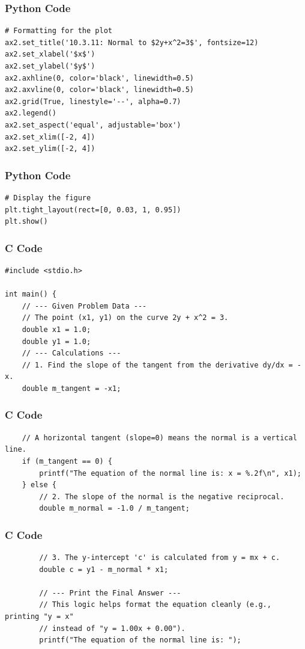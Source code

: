 \documentclass{beamer}
\begin{document}
\begin{frame}[fragile]
\frametitle{Python Code}
\begin{lstlisting}
# Formatting for the plot
ax2.set_title('10.3.11: Normal to $2y+x^2=3$', fontsize=12)
ax2.set_xlabel('$x$')
ax2.set_ylabel('$y$')
ax2.axhline(0, color='black', linewidth=0.5)
ax2.axvline(0, color='black', linewidth=0.5)
ax2.grid(True, linestyle='--', alpha=0.7)
ax2.legend()
ax2.set_aspect('equal', adjustable='box')
ax2.set_xlim([-2, 4])
ax2.set_ylim([-2, 4])
\end{lstlisting}
\end{frame}

\begin{frame}[fragile]
\frametitle{Python Code}
\begin{lstlisting}
# Display the figure
plt.tight_layout(rect=[0, 0.03, 1, 0.95])
plt.show()
\end{lstlisting}
\end{frame}

\begin{frame}[fragile]
\frametitle{C Code}
\begin{lstlisting}
#include <stdio.h>

int main() {
    // --- Given Problem Data ---
    // The point (x1, y1) on the curve 2y + x^2 = 3.
    double x1 = 1.0;
    double y1 = 1.0;
    // --- Calculations ---
    // 1. Find the slope of the tangent from the derivative dy/dx = -x.
    double m_tangent = -x1;
\end{lstlisting}
\end{frame}

\begin{frame}[fragile]
\frametitle{C Code}
\begin{lstlisting}
    // A horizontal tangent (slope=0) means the normal is a vertical line.
    if (m_tangent == 0) {
        printf("The equation of the normal line is: x = %.2f\n", x1);
    } else {
        // 2. The slope of the normal is the negative reciprocal.
        double m_normal = -1.0 / m_tangent;
\end{lstlisting}
\end{frame}

\begin{frame}[fragile]
\frametitle{C Code}
\begin{lstlisting}
        // 3. The y-intercept 'c' is calculated from y = mx + c.
        double c = y1 - m_normal * x1;

        // --- Print the Final Answer ---
        // This logic helps format the equation cleanly (e.g., printing "y = x"
        // instead of "y = 1.00x + 0.00").
        printf("The equation of the normal line is: ");
\end{lstlisting}
\end{frame}
\end{document}
